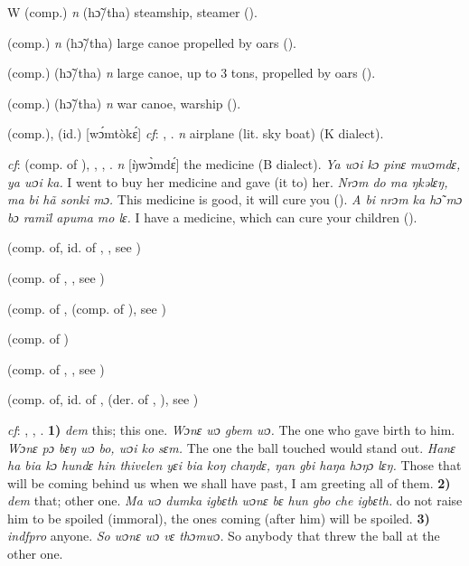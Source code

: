 \begin{letter}{W}
 (comp.) \textit{n} (hɔ̃/tha) steamship, steamer (\citealt{Pichl1967}). 

 (comp.) \textit{n} (hɔ̃/tha) large canoe propelled by oars (\citealt{Pichl1967}). 

 (comp.) (hɔ̃/tha) \textit{n} large canoe, up to 3 tons, propelled by oars (\citealt{Pichl1967}). 

 (comp.) (hɔ̃/tha) \textit{n} war canoe, warship (\citealt{Pichl1967}).

 (comp.), (id.) [wɔ́mtòkɛ́] \textit{cf}: , . \textit{n} airplane (lit. sky boat) (K dialect). 

 \textit{cf}:  (comp. of ), , , . \textit{n} [\`{ŋ}wɔ̀mdɛ́] the medicine (B dialect). \textit{Ya wɔi kɔ pinɛ mwɔmdɛ, ya wɔi ka.} I went to buy her medicine and gave (it to) her. \textit{Nrɔm do ma ŋkəlɛŋ, ma bi hã sonki mɔ.} This medicine is good, it will cure you (\citealt{Pichl1967}). \textit{A bi nrɔm ka hɔ̃ mɔ bɔ ramïl apuma mo lɛ.} I have a medicine, which can cure your children (\citealt{Pichl1967}). 

 (comp. of, id. of , , see ) 

 (comp. of , , see ) 

 (comp. of ,  (comp. of ), see ) 

 (comp. of ) 

 (comp. of , , see ) 

 (comp. of, id. of ,  (der. of , ), see ) 

 \textit{cf}: , , . \textbf{1)} \textit{dem} this; this one. \textit{Wɔnɛ wɔ gbem wɔ.} The one who gave birth to him. \textit{Wɔnɛ pɔ bɛŋ wɔ bo, wɔi ko sɛm.} The one the ball touched would stand out. \textit{Hanɛ ha bia kɔ hundɛ hin thivelen yɛi bia koŋ chaŋdɛ, ŋan gbi haŋa hɔŋɔ lɛŋ.} Those that will be coming behind us when we shall have past, I am greeting all of them. \textbf{2)} \textit{dem} that; other one. \textit{Ma wɔ dumka igbɛth wɔnɛ bɛ hun gbo che igbɛth.} do not raise him to be spoiled (immoral), the ones coming (after him) will be spoiled. \textbf{3)} \textit{indfpro} anyone. \textit{So wɔnɛ wɔ vɛ thɔmwɔ.} So anybody that threw the ball at the other one.


\end{letter}
